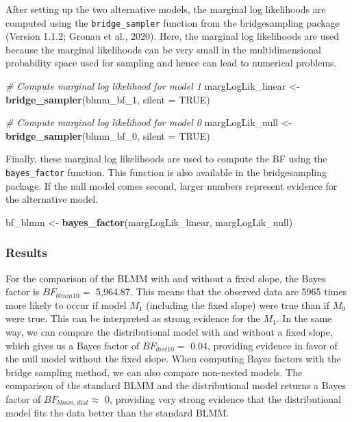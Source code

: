 \documentclass[
  doc,12pt,floatsintext]{apa7}
\newenvironment{Shaded}{\begin{snugshade}}{\end{snugshade}}
\newcommand{\AttributeTok}[1]{\textcolor[rgb]{0.13,0.29,0.53}{#1}}
\newcommand{\CommentTok}[1]{\textcolor[rgb]{0.56,0.35,0.01}{\textit{#1}}}
\newcommand{\ConstantTok}[1]{\textcolor[rgb]{0.56,0.35,0.01}{#1}}
\newcommand{\FunctionTok}[1]{\textcolor[rgb]{0.13,0.29,0.53}{\textbf{#1}}}
\newcommand{\NormalTok}[1]{#1}
\newcommand{\OtherTok}[1]{\textcolor[rgb]{0.56,0.35,0.01}{#1}}
\begin{document}
After setting up the two alternative models, the marginal log likelihoods are computed using the \texttt{bridge\_sampler} function from the bridgesampling package (Version 1.1.2; Gronau et al., 2020). Here, the marginal log likelihoods are used because the marginal likelihoods can be very small in the multidimensional probability space used for sampling and hence can lead to numerical problems.

\begin{Shaded}
\begin{Highlighting}[]
\CommentTok{\# Compute marginal log likelihood for model 1}
\NormalTok{margLogLik\_linear }\OtherTok{\textless{}{-}} \FunctionTok{bridge\_sampler}\NormalTok{(blmm\_bf\_1, }\AttributeTok{silent =} \ConstantTok{TRUE}\NormalTok{)}

\CommentTok{\# Compute marginal log likelihood for model 0}
\NormalTok{margLogLik\_null }\OtherTok{\textless{}{-}} \FunctionTok{bridge\_sampler}\NormalTok{(blmm\_bf\_0, }\AttributeTok{silent =} \ConstantTok{TRUE}\NormalTok{)}
\end{Highlighting}
\end{Shaded}

Finally, these marginal log likelihoods are used to compute the BF using the \texttt{bayes\_factor} function. This function is also available in the bridgesampling package. If the null model comes second, larger numbers represent evidence for the alternative model.

\begin{Shaded}
\begin{Highlighting}[]
\NormalTok{bf\_blmm }\OtherTok{\textless{}{-}} \FunctionTok{bayes\_factor}\NormalTok{(margLogLik\_linear, margLogLik\_null)}
\end{Highlighting}
\end{Shaded}

\subsubsection{Results}\label{results-3}

For the comparison of the BLMM with and without a fixed slope, the Bayes factor is \(BF_{blmm10} =\) 5,964.87. This means that the observed data are 5965 times more likely to occur if model \(M_1\) (including the fixed slope) were true than if \(M_0\) were true. This can be interpreted as strong evidence for the \(M_1\). In the same way, we can compare the distributional model with and without a fixed slope, which gives us a Bayes factor of \(BF_{dist10} =\) 0.04, providing evidence in favor of the null model without the fixed slope. When computing Bayes factors with the bridge sampling method, we can also compare non-nested models. The comparison of the standard BLMM and the distributional model returns a Bayes factor of \(BF_{blmm,dist} \approx\) 0, providing very strong evidence that the distributional model fits the data better than the standard BLMM.
\end{document}

